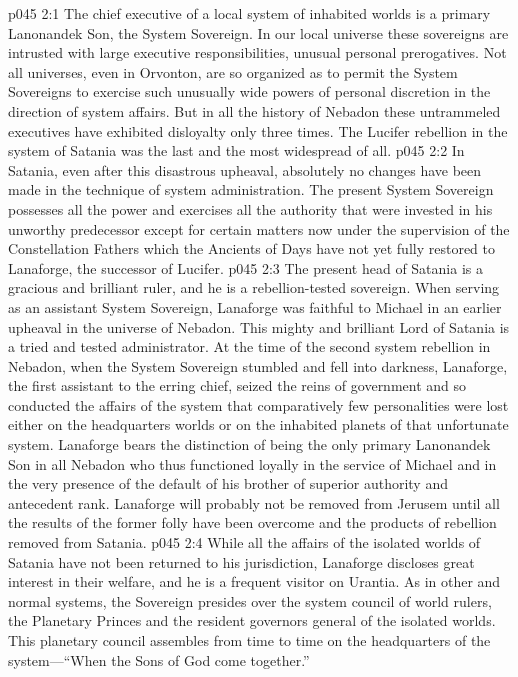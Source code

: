 \vs p045 2:1 The chief executive of a local system of inhabited worlds is a primary Lanonandek Son, the System Sovereign. In our local universe these sovereigns are intrusted with large executive responsibilities, unusual personal prerogatives. Not all universes, even in Orvonton, are so organized as to permit the System Sovereigns to exercise such unusually wide powers of personal discretion in the direction of system affairs. But in all the history of Nebadon these untrammeled executives have exhibited disloyalty only three times. The Lucifer rebellion in the system of Satania was the last and the most widespread of all.
\vs p045 2:2 In Satania, even after this disastrous upheaval, absolutely no changes have been made in the technique of system administration. The present System Sovereign possesses all the power and exercises all the authority that were invested in his unworthy predecessor except for certain matters now under the supervision of the Constellation Fathers which the Ancients of Days have not yet fully restored to Lanaforge, the successor of Lucifer.
\pc \vs p045 2:3 The present head of Satania is a gracious and brilliant ruler, and he is a rebellion\hyp{}tested sovereign. When serving as an assistant System Sovereign, Lanaforge was faithful to Michael in an earlier upheaval in the universe of Nebadon. This mighty and brilliant Lord of Satania is a tried and tested administrator. At the time of the second system rebellion in Nebadon, when the System Sovereign stumbled and fell into darkness, Lanaforge, the first assistant to the erring chief, seized the reins of government and so conducted the affairs of the system that comparatively few personalities were lost either on the headquarters worlds or on the inhabited planets of that unfortunate system. Lanaforge bears the distinction of being the only primary Lanonandek Son in all Nebadon who thus functioned loyally in the service of Michael and in the very presence of the default of his brother of superior authority and antecedent rank. Lanaforge will probably not be removed from Jerusem until all the results of the former folly have been overcome and the products of rebellion removed from Satania.
\pc \vs p045 2:4 While all the affairs of the isolated worlds of Satania have not been returned to his jurisdiction, Lanaforge discloses great interest in their welfare, and he is a frequent visitor on Urantia. As in other and normal systems, the Sovereign presides over the system council of world rulers, the Planetary Princes and the resident governors general of the isolated worlds. This planetary council assembles from time to time on the headquarters of the system---“When the Sons of God come together.”

